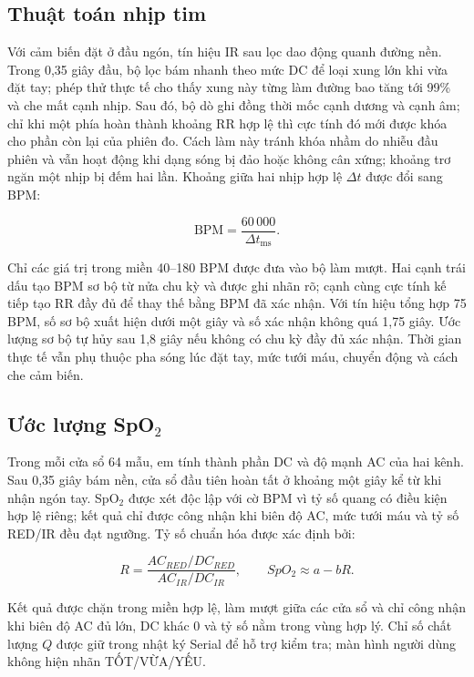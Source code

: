 \documentclass[12pt]{article}
\begin{document}
\subsection{Thuật toán nhịp tim}

Với cảm biến đặt ở đầu ngón, tín hiệu IR sau lọc dao động quanh đường nền. Trong 0,35 giây đầu, bộ lọc bám nhanh theo mức DC để loại xung lớn khi vừa đặt tay; phép thử thực tế cho thấy xung này từng làm đường bao tăng tới 99\% và che mất cạnh nhịp. Sau đó, bộ dò ghi đồng thời mốc cạnh dương và cạnh âm; chỉ khi một phía hoàn thành khoảng RR hợp lệ thì cực tính đó mới được khóa cho phần còn lại của phiên đo. Cách làm này tránh khóa nhầm do nhiễu đầu phiên và vẫn hoạt động khi dạng sóng bị đảo hoặc không cân xứng; khoảng trơ ngăn một nhịp bị đếm hai lần. Khoảng giữa hai nhịp hợp lệ $\Delta t$ được đổi sang BPM:

\[
  \mathrm{BPM}=\frac{60\,000}{\Delta t_{\mathrm{ms}}}.
\]

Chỉ các giá trị trong miền 40--180 BPM được đưa vào bộ làm mượt. Hai cạnh trái dấu tạo BPM sơ bộ từ nửa chu kỳ và được ghi nhãn rõ; cạnh cùng cực tính kế tiếp tạo RR đầy đủ để thay thế bằng BPM đã xác nhận. Với tín hiệu tổng hợp 75 BPM, số sơ bộ xuất hiện dưới một giây và số xác nhận không quá 1,75 giây. Ước lượng sơ bộ tự hủy sau 1,8 giây nếu không có chu kỳ đầy đủ xác nhận. Thời gian thực tế vẫn phụ thuộc pha sóng lúc đặt tay, mức tưới máu, chuyển động và cách che cảm biến.

\subsection{\texorpdfstring{Ước lượng SpO$_2$}{Ước lượng SpO2}}

Trong mỗi cửa sổ 64 mẫu, em tính thành phần DC và độ mạnh AC của hai kênh. Sau 0,35 giây bám nền, cửa sổ đầu tiên hoàn tất ở khoảng một giây kể từ khi nhận ngón tay. SpO$_2$ được xét độc lập với cờ BPM vì tỷ số quang có điều kiện hợp lệ riêng; kết quả chỉ được công nhận khi biên độ AC, mức tưới máu và tỷ số RED/IR đều đạt ngưỡng. Tỷ số chuẩn hóa được xác định bởi:

\[
 R=\frac{AC_{RED}/DC_{RED}}{AC_{IR}/DC_{IR}},
 \qquad SpO_2\approx a-bR.
\]

Kết quả được chặn trong miền hợp lệ, làm mượt giữa các cửa sổ và chỉ công nhận khi biên độ AC đủ lớn, DC khác 0 và tỷ số nằm trong vùng hợp lý. Chỉ số chất lượng $Q$ được giữ trong nhật ký Serial để hỗ trợ kiểm tra; màn hình người dùng không hiện nhãn TỐT/VỪA/YẾU.
\end{document}
